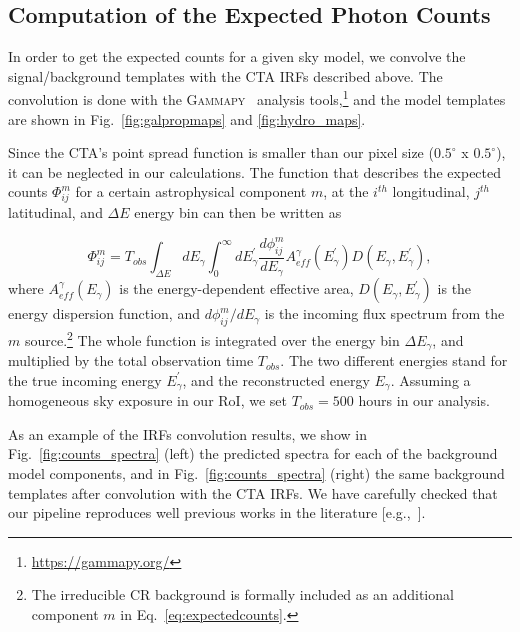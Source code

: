 \documentclass[doublespace,nopageskip]{VTthesis} %
\begin{document}
\subsection{Computation of the Expected Photon Counts }
\label{subsec:expectedcounts}

In order to get the expected counts for a given sky model, we convolve the signal/background templates with the CTA IRFs described above. The convolution is done with the \textsc{Gammapy}~\citep{2017ICRC...35..766D,2019A&A...625A..10N} analysis tools,\footnote{\url{https://gammapy.org/}} and the model templates are shown in Fig.~\ref{fig:galpropmaps} and \ref{fig:hydro_maps}.

Since the CTA's point spread function is smaller than our pixel size ($0.5^{\circ} $ x $ 0.5^{\circ}$), it can be neglected in our calculations. The function that describes the expected counts $\Phi^m_{ij}$ for a certain astrophysical component $m$, at the $i^{th}$ longitudinal, $j^{th}$ latitudinal, and $\Delta E$ energy bin can then be written as

\begin{equation}\label{eq:expectedcounts}
    \Phi^m_{ij} = T_{obs} \int_{\Delta E} dE_{\gamma} \int_{0}^{\infty} dE^{'}_{\gamma}  \frac{d\phi^{m}_{ij}}{dE_{\gamma}} A^{\gamma}_{eff}(E^{'}_{\gamma}) D(E_{\gamma},E_{\gamma}^{'}),
\end{equation} 
where $A^{\gamma}_{eff}(E_\gamma)$ is the energy-dependent effective area, $D(E_{\gamma},E_{\gamma}^{'})$ is the energy dispersion function, and $d\phi^{m}_{ij}/dE_{\gamma}$ is the incoming flux spectrum from the $m$ source.\footnote{The irreducible CR background is formally included as an additional component $m$ in Eq.~\ref{eq:expectedcounts}.} The whole function is integrated over the energy bin $\Delta E_{\gamma}$, and multiplied by the total observation time $T_{obs}$. The two different energies stand for the true incoming energy $E_{\gamma}^{'}$, and the reconstructed energy $E_{\gamma}$. Assuming a homogeneous sky exposure in our RoI, we set $T_{obs}=500$ hours in our analysis. 

As an example of the IRFs convolution results, we show in Fig.~\ref{fig:counts_spectra} (left) the predicted spectra for each of the background model components, and in Fig.~\ref{fig:counts_spectra} (right) the same background templates after convolution with the CTA IRFs. We have carefully checked that our pipeline reproduces well previous works in the literature [e.g.,~\citep{2021PhRvD.103b3011R}].
\end{document}
